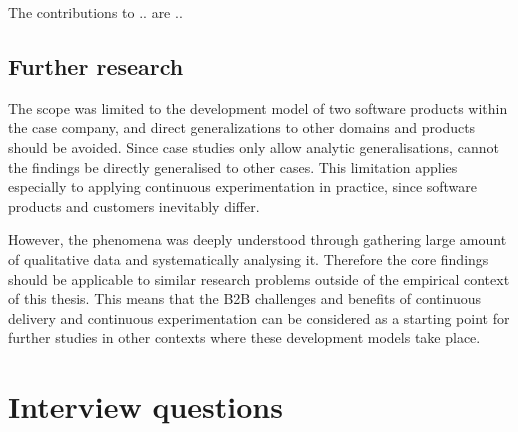 \documentclass[english]{tktltiki2}
\theoremstyle{definition}
\theoremstyle{remark}
\begin{document}

The contributions to .. are ..

\subsection{Further research}

The scope was limited to the development model of two software products within the case company, and direct generalizations to other domains and products should be avoided. Since case studies only allow analytic generalisations, cannot the findings be directly generalised to other cases. This limitation applies especially to applying continuous experimentation in practice, since software products and customers inevitably differ.

However, the phenomena was deeply understood through gathering large amount of qualitative data and systematically analysing it. %
Therefore the core findings should be applicable to similar research problems outside of the empirical context of this thesis. This means that the B2B challenges and benefits of continuous delivery and continuous experimentation can be considered as a starting point for further studies in other contexts where these development models take place.


\newpage

%
%
% 
%






\newpage

\appendix
 
\section{Interview questions}
\end{document}
